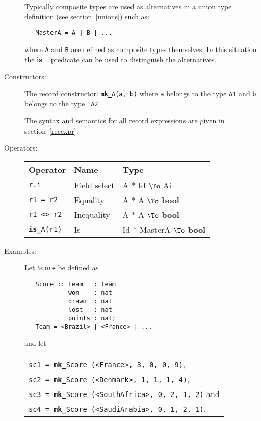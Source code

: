 \documentclass{overturerepchap}
\newcommand{\keyw}[1]{{\bf\ttfamily #1}}
\newcommand{\PROD}[2]{#1 * #2}
\newcommand{\TO}[2]{#1 $\To$ #2}
\begin{document}
\begin{description}
  Typically composite types are used as alternatives in a union type
  definition (see section~\ref{unions}) such as:

  \begin{lstlisting}
   MasterA = A | B | ...
  \end{lstlisting}
  where \texttt{A} and \texttt{B} are defined as composite types
  themselves. In this situation the \keyw{is\_} predicate can be used
  to distinguish the alternatives.

\item[Constructors:] The record constructor: {\tt \keyw{mk\_}A(a, b)} where
  {\tt a} belongs to the type {\tt A1} and {\tt b} belongs to the type {\tt
    A2}.

  The syntax and semantics for all record expressions are given in
  section~\ref{recexpr}.%
\index{\keyw{mk\_}!record constructor}

\item[Operators:] \mbox{}

  \begin{tabular}{|l|l|l|} \hline
    Operator & Name & Type \\ \hline
    {\tt r.i} & Field select & \TO{\PROD{A}{Id}}{Ai} \\
    {\tt r1 = r2} & Equality & \TO{\PROD{A}{A}}{\keyw{bool}} \\
    {\tt r1 <> r2} & Inequality & \TO{\PROD{A}{A}}{\keyw{bool}} \\
    {\tt \keyw{is\_}A(r1)} & Is & \TO{\PROD{Id}{MasterA}}{\keyw{bool}} \\
    \hline
  \end{tabular}%
%



\item[Examples:] Let \texttt{Score} be defined as
\begin{lstlisting}
   Score :: team   : Team
            won    : nat
            drawn  : nat
            lost   : nat
            points : nat;
   Team = <Brazil> | <France> | ...
\end{lstlisting}
\label{scoredef}
and let

\begin{tabular}{l}
\texttt{sc1 = \keyw{mk\_}Score (<France>, 3, 0, 0, 9)}, \\
\texttt{sc2 = \keyw{mk\_}Score (<Denmark>, 1, 1, 1, 4)},\\
\texttt{sc3 = \keyw{mk\_}Score (<SouthAfrica>, 0, 2, 1, 2)} and \\
\texttt{sc4 = \keyw{mk\_}Score (<SaudiArabia>, 0, 1, 2, 1)}.
\end{tabular}


\end{description}
\end{document}

